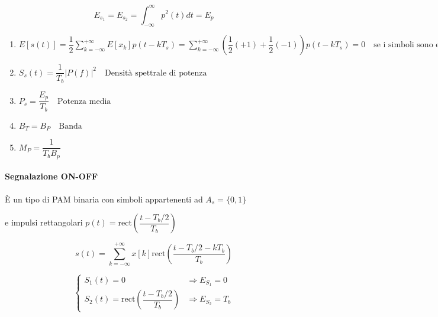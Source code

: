 \[
E_{s_1} = E_{s_2} = \int_{-\infty}^{\infty} p^2(t) dt = E_p
\]

\begin{center}
    
\end{center}



\begin{enumerate}
  \item $E\left[s(t)\right] = \dfrac{1}{2} \sum_{k=-\infty}^{+\infty} E[x_k] p(t-kT_s)
  = \sum_{k=-\infty}^{+\infty} \left(\dfrac{1}{2} (+1) + \dfrac{1}{2} (-1)\right) p(t-kT_s) = 0 \quad \text{se i simboli sono equiprobabili}$
  
  \item $S_s(t) = \dfrac{1}{T_b} |P(f)|^2 \quad \text{Densità spettrale di potenza}$
  
  \item $P_s = \dfrac{E_p}{T_b} \quad \text{Potenza media}$
  
  \item $B_T = B_P \quad \text{Banda}$
  
  \item $M_P = \dfrac{1}{T_bB_p}$
\end{enumerate}

\paragraph{Segnalazione ON-OFF}

È un tipo di PAM binaria con simboli appartenenti ad $A_s = \{0, 1\}$

e impulsi rettangolari  $p(t) = \text{rect}\left(\dfrac{t-T_b/2}{T_b}\right)$

\[ 
s(t) = \sum_{k=-\infty}^{+\infty} x\left[k\right] \text{rect}\left(\dfrac{t-T_b/2-kT_b}{T_b}\right)
\]

\[
\begin{cases}
  S_1(t) = 0 & \Rightarrow E_{S_1} = 0 \\
  S_2(t) = \text{rect}\left(\dfrac{t-T_b/2}{T_b}\right) & \Rightarrow E_{S_2} = T_b
\end{cases}
\]


